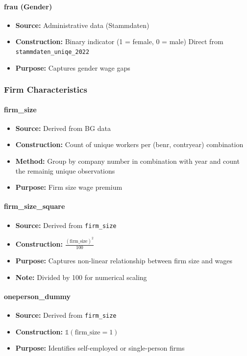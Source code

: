 \documentclass{article}
\begin{document}
\paragraph{frau (Gender)}
\begin{itemize}
    \item \textbf{Source:} Administrative data (Stammdaten)
    \item \textbf{Construction:} Binary indicator (1 = female, 0 = male) \newline
    Direct from \texttt{stammdaten\_uniqe\_2022}
    \item \textbf{Purpose:} Captures gender wage gaps
\end{itemize}

\subsubsection{Firm Characteristics}

\paragraph{firm\_size}
\begin{itemize}
    \item \textbf{Source:} Derived from BG data
    \item \textbf{Construction:} Count of unique workers per (benr, contryear) combination 
    \item \textbf{Method:} Group by company number in combination with year and count the remainig unique observations
    \item \textbf{Purpose:} Firm size wage premium
\end{itemize}

\paragraph{firm\_size\_square}
\begin{itemize}
    \item \textbf{Source:} Derived from \texttt{firm\_size}
    \item \textbf{Construction:} $\frac{(\text{firm\_size})^2}{100}$
    \item \textbf{Purpose:} Captures non-linear relationship between firm size and wages
    \item \textbf{Note:} Divided by 100 for numerical scaling
\end{itemize}

\paragraph{oneperson\_dummy}
\begin{itemize}
    \item \textbf{Source:} Derived from \texttt{firm\_size}
    \item \textbf{Construction:} $\mathbb{1}(\text{firm\_size} = 1)$
    \item \textbf{Purpose:} Identifies self-employed or single-person firms
\end{itemize}
\end{document}
